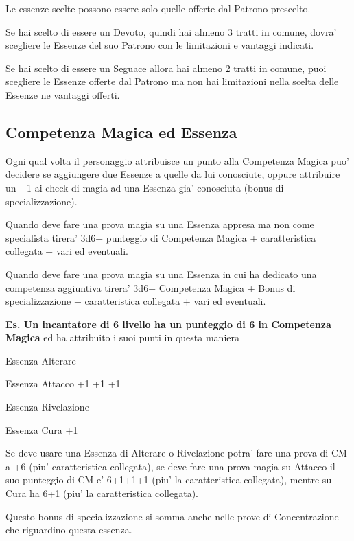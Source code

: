 \documentclass[a4paper,11pt,twoside,openany]{book}
\begin{document}
	Le essenze scelte possono essere solo quelle offerte dal Patrono prescelto.
	
	Se hai scelto di essere un Devoto, quindi hai almeno 3 tratti in comune, dovra' scegliere le Essenze del suo Patrono con le limitazioni e vantaggi indicati.
	
	Se hai scelto di essere un Seguace allora hai almeno 2 tratti in comune, puoi scegliere le Essenze offerte dal Patrono ma non hai limitazioni nella scelta delle Essenze ne vantaggi offerti.
	
	\subsection{Competenza Magica ed Essenza}
	
	\label{competenza-magica-ed-essenza}
	
	Ogni qual volta il personaggio attribuisce un punto alla Competenza Magica puo' decidere se aggiungere due Essenze a quelle da lui conosciute, oppure attribuire un +1 ai check di magia ad una Essenza gia' conosciuta (bonus di specializzazione).
	
	Quando deve fare una prova magia su una Essenza appresa ma non come specialista tirera' 3d6+ punteggio di Competenza Magica + caratteristica collegata + vari ed eventuali.
	
	Quando deve fare una prova magia su una Essenza in cui ha dedicato una competenza aggiuntiva tirera' 3d6+ Competenza Magica + Bonus di specializzazione + caratteristica collegata + vari ed eventuali.
	
	\bigskip
	
	\textbf{Es. Un incantatore di 6 livello ha un punteggio di 6 in Competenza Magica} ed ha attribuito i suoi punti in questa maniera
	
	Essenza Alterare
	
	Essenza Attacco +1 +1 +1
	
	Essenza Rivelazione
	
	Essenza Cura +1
	
	Se deve usare una Essenza di Alterare o Rivelazione potra' fare una prova di CM a +6 (piu' caratteristica collegata), se deve fare una prova magia su Attacco il suo punteggio di CM e' 6+1+1+1 (piu' la caratteristica collegata), mentre su Cura ha 6+1 (piu' la caratteristica collegata).
	
	Questo bonus di specializzazione si somma anche nelle prove di Concentrazione che riguardino questa essenza.
	
\end{document}
